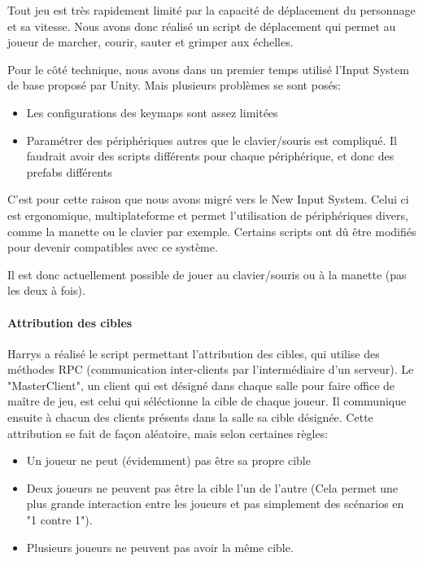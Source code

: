             Tout jeu est très rapidement limité par la capacité de déplacement du personnage et sa vitesse.
            Nous avons donc réalisé un script de déplacement qui permet au joueur de marcher, courir, sauter et grimper aux échelles.

            Pour le côté technique, nous avons dans un premier temps utilisé l'Input System de base proposé par Unity. Mais plusieurs problèmes se sont posés:
            \begin{itemize}
                \item Les configurations des keymaps sont assez limitées
                \item Paramétrer des périphériques autres que le clavier/souris est compliqué. Il faudrait avoir des scripts différents pour chaque périphérique, et donc des prefabs différents
            \end{itemize}
            C'est pour cette raison que nous avons migré vers le New Input System.
            Celui ci est ergonomique, multiplateforme et permet l'utilisation de périphériques divers, comme la manette ou le clavier par exemple.
            Certains scripts ont dû être modifiés pour devenir compatibles avec ce système.

            Il est donc actuellement possible de jouer au clavier/souris ou à la manette (pas les deux à fois).
            
        \paragraph{Attribution des cibles}
            
            Harrys a réalisé le script permettant l'attribution des cibles, qui utilise des méthodes RPC (communication inter-clients par l'intermédiaire d'un serveur). Le "MasterClient", un client qui est désigné dans chaque salle pour faire office de maître de jeu, est celui qui séléctionne la cible de chaque joueur. Il communique ensuite à chacun des clients présents dans la salle sa cible désignée. Cette attribution se fait de façon aléatoire, mais selon certaines règles:
            \begin{itemize}
                \item Un joueur ne peut (évidemment) pas être sa propre cible
                \item Deux joueurs ne peuvent pas être la cible l'un de l'autre (Cela permet une plus grande interaction entre les joueurs et pas simplement des scénarios en "1 contre 1").
                \item Plusieurs joueurs ne peuvent pas avoir la même cible.
            \end{itemize}
                

